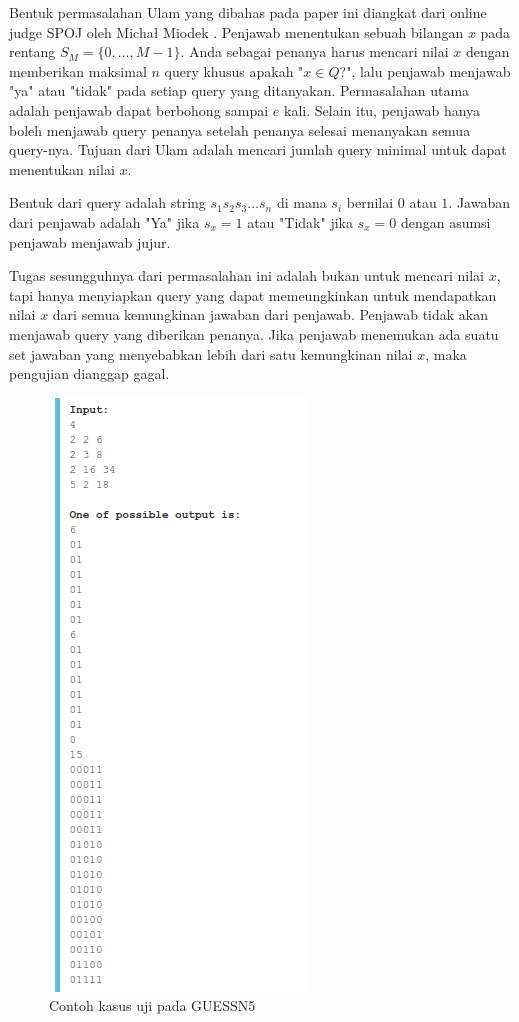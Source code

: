 Bentuk permasalahan Ulam yang dibahas pada paper ini diangkat dari online judge SPOJ oleh Micha\l{} Miodek \cite{guessn5}. Penjawab menentukan sebuah bilangan $x$ pada rentang $S_M=\{0,\ldots,M-1\}$. Anda sebagai penanya harus mencari nilai $x$ dengan memberikan maksimal $n$ query khusus apakah "$x \in Q$?", lalu penjawab menjawab "ya" atau "tidak" pada setiap query yang ditanyakan. Permasalahan utama adalah penjawab dapat berbohong sampai $e$ kali. Selain itu, penjawab hanya boleh menjawab query penanya setelah penanya selesai menanyakan semua query-nya. Tujuan dari Ulam adalah mencari jumlah query minimal untuk dapat menentukan nilai $x$.

Bentuk dari query adalah string $s_1s_2s_3\ldots s_n$ di mana $s_i$ bernilai $0$ atau $1$. Jawaban dari penjawab adalah "Ya" jika $s_x=1$ atau "Tidak" jika $s_x=0$ dengan asumsi penjawab menjawab jujur.

Tugas sesungguhnya dari permasalahan ini adalah bukan untuk mencari nilai $x$, tapi hanya menyiapkan query yang dapat memeungkinkan untuk mendapatkan nilai $x$ dari semua kemungkinan jawaban dari penjawab. Penjawab tidak akan menjawab query yang diberikan penanya. Jika penjawab menemukan ada suatu set jawaban yang menyebabkan lebih dari satu kemungkinan nilai $x$, maka pengujian dianggap gagal.

\begin{figure}
\centering
\includegraphics[scale=0.43]{../img/example.png}
\caption{Contoh kasus uji pada GUESSN5}
\label{fig:guessn5_test_case}
\end{figure}


